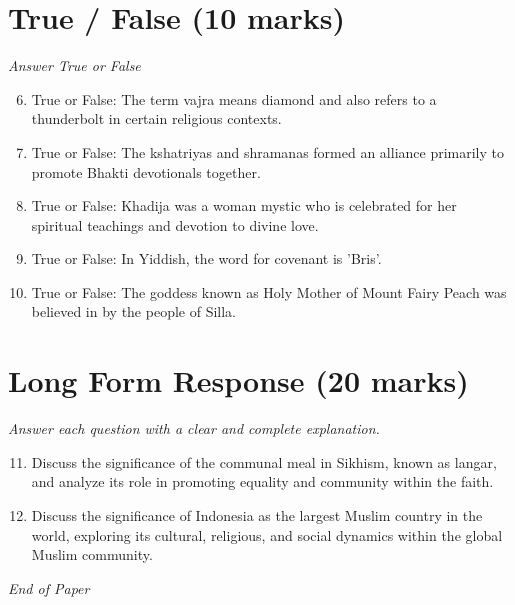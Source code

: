 \documentclass[12pt]{article}
\begin{document}
\section*{True / False (10 marks)}
\textit{Answer True or False}
\begin{enumerate}[label=\arabic*.]
\setcounter{enumi}{5}
\item True or False: The term vajra means diamond and also refers to a thunderbolt in certain religious contexts.
\item True or False: The kshatriyas and shramanas formed an alliance primarily to promote Bhakti devotionals together.
\item True or False: Khadija was a woman mystic who is celebrated for her spiritual teachings and devotion to divine love.
\item True or False: In Yiddish, the word for covenant is 'Bris'.
\item True or False: The goddess known as Holy Mother of Mount Fairy Peach was believed in by the people of Silla.
\end{enumerate}

\section*{Long Form Response (20 marks)}
\textit{Answer each question with a clear and complete explanation.}
\begin{enumerate}[label=\arabic*.]
\setcounter{enumi}{10}
\item Discuss the significance of the communal meal in Sikhism, known as langar, and analyze its role in promoting equality and community within the faith.
\item Discuss the significance of Indonesia as the largest Muslim country in the world, exploring its cultural, religious, and social dynamics within the global Muslim community.
\end{enumerate}

\vfill
\noindent\textit{End of Paper}
\end{document}
